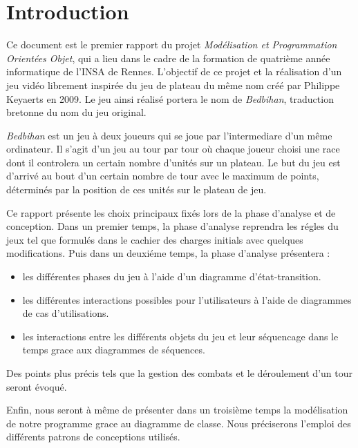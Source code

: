 \section{Introduction}
	
	Ce document est le premier rapport du projet \emph{Modélisation et Programmation Orientées Objet}, qui a lieu dans le cadre de la formation de quatrième année informatique de l'INSA de Rennes. L'objectif de ce projet et la réalisation d'un jeu vidéo librement inspirée du jeu de plateau du même nom créé par Philippe Keyaerts en 2009. Le jeu ainsi réalisé portera le nom de \emph{Bedbihan}, traduction bretonne du nom du jeu original. 

	\emph{Bedbihan} est un jeu à deux joueurs qui se joue par l'intermediare d'un même ordinateur. Il s'agit d'un jeu au tour par tour où chaque joueur choisi une race dont il controlera un certain nombre d'unités sur un plateau. Le but du jeu est d'arrivé au bout d'un certain nombre de tour avec le maximum de points, déterminés par la position de ces unités sur le plateau de jeu. 

	Ce rapport présente les choix principaux fixés lors de la phase d'analyse et de conception. Dans un premier temps, la phase d'analyse reprendra les régles du jeux tel que formulés dans le cachier des charges initials avec quelques modifications.
	Puis dans un deuxiéme temps, la phase d'analyse présentera :
	\begin{itemize}
		\item les différentes phases du jeu à l'aide d'un diagramme d'état-transition.
		\item les différentes interactions possibles pour l'utilisateurs à l'aide de diagrammes de cas d'utilisations.
		\item les interactions entre les différents objets du jeu et leur séquencage dans le temps grace aux diagrammes de séquences.  
	\end{itemize}
	Des points plus précis tels que la gestion des combats et le déroulement d'un tour seront évoqué. 

	Enfin, nous seront à même de présenter dans un troisième temps la modélisation de notre programme grace au diagramme de classe. Nous préciserons l'emploi des différents patrons de conceptions utilisés.



















